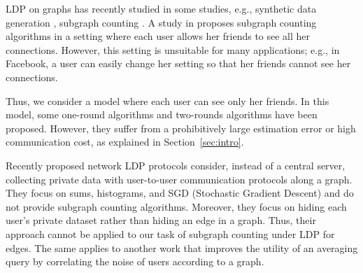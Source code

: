 LDP on graphs has recently studied in some studies, e.g., synthetic data generation \cite{Qin_CCS17}, subgraph counting \cite{Imola_USENIX21,Sun_CCS19,Ye_ICDE20,Ye_TKDE21}.
A study in
\cite{Sun_CCS19} proposes subgraph counting algorithms in a setting where each user
allows her friends to see all her connections.
However, this setting is unsuitable for
many applications; e.g., in Facebook, a user can easily change her setting so that
her friends cannot see her connections.



Thus, we consider a model where each user can see only her friends.
In this model, some one-round algorithms \cite{Ye_ICDE20,Ye_TKDE21}
and two-rounds algorithms\cite{Imola_USENIX21} have been proposed.
However, they suffer from a prohibitively large estimation error or high communication cost, as explained in Section~\ref{sec:intro}.

Recently proposed network LDP protocols \cite{Cyffers_arXiv21} consider, instead of a central server, collecting private data with user-to-user communication protocols along a graph. 
They focus on sums, histograms, and SGD (Stochastic Gradient Descent) and do not provide subgraph counting algorithms. 
Moreover, they focus on hiding each user's private dataset rather than hiding an edge in a graph. 
Thus, their approach cannot be applied to our task of subgraph counting under LDP for edges. 
The same applies to 
another work \cite{Sabater_arXiv21} 
that improves 
the utility of an averaging query
by correlating the noise of users according to a graph.

